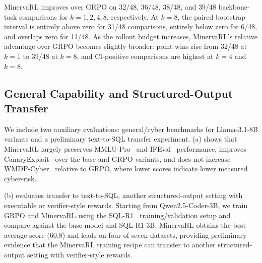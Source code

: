 MinervaRL improves over GRPO on 32/48, 36/48, 38/48, and 39/48 backbone-task comparisons for $k=1,2,4,8$, respectively. At $k=8$, the paired bootstrap interval is entirely above zero for 31/48 comparisons, entirely below zero for 6/48, and overlaps zero for 11/48. As the rollout budget increases, MinervaRL's relative advantage over GRPO becomes slightly broader: point wins rise from 32/48 at $k=1$ to 39/48 at $k=8$, and CI-positive comparisons are highest at $k=4$ and $k=8$.








\subsection{General Capability and Structured-Output Transfer}
\label{sec:other-benchmarks-transfer}




We include two auxiliary evaluations: general/cyber benchmarks for Llama-3.1-8B variants and a preliminary text-to-SQL transfer experiment. (a) shows that MinervaRL largely preserves MMLU-Pro~\citep{wang2024mmlu} and IFEval~\citep{zhou2023instruction} performance, improves CanaryExploit~\citep{bhatt2024cyberseceval} over the base and GRPO variants, and does not increase WMDP-Cyber~\citep{li2024wmdp} relative to GRPO, where lower scores indicate lower measured cyber-risk.

(b) evaluates transfer to text-to-SQL, another structured-output setting with executable or verifier-style rewards. Starting from Qwen2.5-Coder-3B, we train GRPO and MinervaRL using the SQL-R1~\citep{ma2025sqlr1} training/validation setup and compare against the base model and SQL-R1-3B. MinervaRL obtains the best average score (60.8) and leads on four of seven datasets, providing preliminary evidence that the MinervaRL training recipe can transfer to another structured-output setting with verifier-style rewards.

